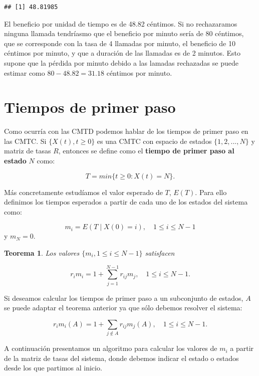 \documentclass[
]{book}
\newtheorem{theorem}{Teorema}[chapter]
\theoremstyle{definition}
\theoremstyle{definition}
\theoremstyle{definition}
\theoremstyle{definition}
\theoremstyle{remark}
\begin{document}
\begin{verbatim}
## [1] 48.81985
\end{verbatim}

El beneficio por unidad de tiempo es de 48.82 céntimos. Si no rechazaramos ninguna llamada tendríasmo que el beneficio por minuto sería de 80 céntimos, que se corresponde con la tasa de 4 llamadas por minuto, el beneficio de 10 céntimos por minuto, y que a duración de las llamadas es de 2 minutos. Esto supone que la pérdida por minuto debido a las lamadas rechazadas se puede estimar como \(80 - 48.82 = 31.18\) céntimos por minuto.

\hypertarget{CMTCJ}{%
\section{Tiempos de primer paso}\label{CMTCJ}}

Como ocurría con las CMTD podemos hablar de los tiempos de primer paso en las CMTC. Si \(\{X(t), t \geq 0\}\) es una CMTC con espacio de estados \(\{1, 2,...,N\}\) y matriz de tasas \(R\), entonces se define como el \textbf{tiempo de primer paso al estado} \(N\) como:

\[T = min\{t \geq 0: X(t) = N\}.\]

Más concretamente estudíamos el valor esperado de \(T\), \(E(T)\). Para ello definimos los tiempos esperados a partir de cada uno de los estados del sistema como:

\[m_i = E(T \mid X(0) = i), \quad 1 \leq i \leq N-1\] y \(m_N = 0.\)

\begin{theorem}
Los valores \(\{m_i, 1 \leq i \leq N-1\}\) satisfacen

\[r_im_i = 1 + \sum_{j=1}^{N-1} r_{ij}m_j, \quad 1\leq i \leq N-1.\]
\end{theorem}

Si deseamos calcular los tiempos de primer paso a un subconjunto de estados, \(A\) se puede adaptar el teorema anterior ya que sólo debemos resolver el sistema:

\[r_im_i(A) = 1 + \sum_{j \notin A} r_{ij}m_j(A), \quad 1\leq i \leq N-1.\]

A continuación presentamos un algoritmo para calcular los valores de \(m_i\) a partir de la matriz de tasas del sistema, donde debemos indicar el estado o estados desde los que partimos al inicio.
\end{document}
